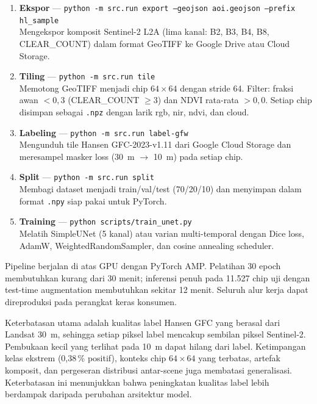 \documentclass[10pt,a4paper,onecolumn]{article}
\begin{document}
\begin{enumerate}[nosep]
    \item \textbf{Ekspor} --- \texttt{python -m src.run export --geojson aoi.geojson --prefix hl\_sample} \\
    Mengekspor komposit Sentinel-2 L2A (lima kanal: B2, B3, B4, B8, CLEAR\_COUNT) dalam format GeoTIFF ke Google Drive atau Cloud Storage.
    \item \textbf{Tiling} --- \texttt{python -m src.run tile} \\
    Memotong GeoTIFF menjadi chip $64\times64$ dengan stride 64. Filter:
    fraksi awan $<0{,}3$ (CLEAR\_COUNT $\geq3$) dan NDVI rata-rata $>0{,}0$.
    Setiap chip disimpan sebagai \texttt{.npz} dengan larik rgb, nir, ndvi, dan cloud.
    \item \textbf{Labeling} --- \texttt{python -m src.run label-gfw} \\
    Mengunduh tile Hansen GFC-2023-v1.11 dari Google Cloud Storage dan
    meresampel masker loss (30~m $\to$ 10~m) pada setiap chip.
    \item \textbf{Split} --- \texttt{python -m src.run split} \\
    Membagi dataset menjadi train/val/test (70/20/10) dan menyimpan dalam
    format \texttt{.npy} siap pakai untuk PyTorch.
    \item \textbf{Training} --- \texttt{python scripts/train\_unet.py} \\
    Melatih SimpleUNet (5 kanal) atau varian multi-temporal dengan Dice
    loss, AdamW, WeightedRandomSampler, dan cosine annealing scheduler.
\end{enumerate}

Pipeline berjalan di atas GPU dengan PyTorch AMP. Pelatihan 30 epoch
membutuhkan kurang dari 30 menit; inferensi penuh pada 11.527 chip uji
dengan test-time augmentation membutuhkan sekitar 12 menit. Seluruh
alur kerja dapat direproduksi pada perangkat keras konsumen.

Keterbatasan utama adalah kualitas label Hansen GFC yang berasal dari
Landsat 30~m, sehingga setiap piksel label mencakup sembilan piksel
Sentinel-2. Pembukaan kecil yang terlihat pada 10~m dapat hilang dari
label. Ketimpangan kelas ekstrem (0,38\,\% positif), konteks chip
$64\times64$ yang terbatas, artefak komposit, dan pergeseran distribusi
antar-scene juga membatasi generalisasi. Keterbatasan ini menunjukkan
bahwa peningkatan kualitas label lebih berdampak daripada perubahan
arsitektur model.
\end{document}
